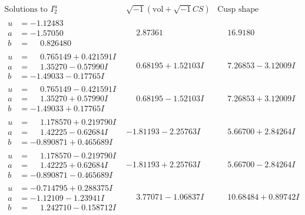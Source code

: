 \documentclass[1p]{elsarticle_modified}
\theoremstyle{definition}
\newcommand{\I}{\sqrt{-1}}
\begin{document}
$$\begin{array}{c|c|c}  
\text{Solutions to }I^u_{2}& \I (\text{vol} + \sqrt{-1}CS) & \text{Cusp shape}\\
 \hline 
\begin{aligned}
u &= -1.12483\phantom{ +0.000000I} \\
a &= -1.57050\phantom{ +0.000000I} \\
b &= \phantom{-}0.826480\phantom{ +0.000000I}\end{aligned}
 & \phantom{-}2.87361\phantom{ +0.000000I} & \phantom{-}16.9180\phantom{ +0.000000I} \\ \hline\begin{aligned}
u &= \phantom{-}0.765149 + 0.421591 I \\
a &= \phantom{-}1.35270 - 0.57990 I \\
b &= -1.49033 - 0.17765 I\end{aligned}
 & \phantom{-}0.68195 + 1.52103 I & \phantom{-}7.26853 - 3.12009 I \\ \hline\begin{aligned}
u &= \phantom{-}0.765149 - 0.421591 I \\
a &= \phantom{-}1.35270 + 0.57990 I \\
b &= -1.49033 + 0.17765 I\end{aligned}
 & \phantom{-}0.68195 - 1.52103 I & \phantom{-}7.26853 + 3.12009 I \\ \hline\begin{aligned}
u &= \phantom{-}1.178570 + 0.219790 I \\
a &= \phantom{-}1.42225 - 0.62684 I \\
b &= -0.890871 + 0.465689 I\end{aligned}
 & -1.81193 - 2.25763 I & \phantom{-}5.66700 + 2.84264 I \\ \hline\begin{aligned}
u &= \phantom{-}1.178570 - 0.219790 I \\
a &= \phantom{-}1.42225 + 0.62684 I \\
b &= -0.890871 - 0.465689 I\end{aligned}
 & -1.81193 + 2.25763 I & \phantom{-}5.66700 - 2.84264 I \\ \hline\begin{aligned}
u &= -0.714795 + 0.288375 I \\
a &= -1.12109 - 1.23941 I \\
b &= \phantom{-}1.242710 - 0.158712 I\end{aligned}
 & \phantom{-}3.77071 - 1.06837 I & \phantom{-}10.68484 + 0.89742 I \\ \hline\begin{aligned}

\end{aligned}
\end{array}$$
\end{document}
